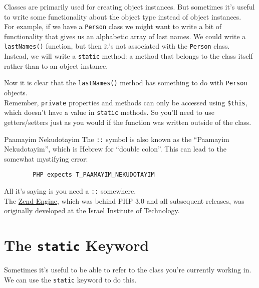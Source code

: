 Classes are primarily used for creating object instances. But sometimes it's useful to write some functionality about the object type instead of object instances.
\\

For example, if we have a \texttt{Person} class we might want to write a bit of functionality that gives us an alphabetic array of last names. We could write a \texttt{lastNames()} function, but then it's not associated with the \texttt{Person} class.
\\

Instead, we will write a \texttt{static} method: a method that belongs to the class itself rather than to an object instance.


Now it is clear that the \texttt{lastNames()} method has something to do with \texttt{Person} objects.
\\

Remember, \texttt{private} properties and methods can only be accessed using \texttt{\$this}, which doesn't have a value in \texttt{static} methods. So you'll need to use getters/setters just as you would if the function was written outside of the class.


\begin{infobox}{Paamayim Nekudotayim}
    The \texttt{::} symbol is also known as the ``Paamayim Nekudotayim'', which is Hebrew for ``double colon''. This can lead to the somewhat mystifying error:

    \begin{verbatim}
        PHP expects T_PAAMAYIM_NEKUDOTAYIM
    \end{verbatim}

    All it's saying is you need a \texttt{::} somewhere.
    \\

    The \href{https://en.wikipedia.org/wiki/Zend_Engine}{Zend Engine}, which was behind PHP 3.0 and all subsequent releases, was originally developed at the Israel Institute of Technology.
\end{infobox}

\section{The \texttt{static} Keyword}

Sometimes it's useful to be able to refer to the class you're currently working in. We can use the \texttt{static} keyword to do this.
\\

